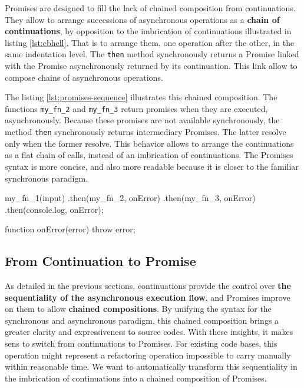 Promises are designed to fill the lack of chained composition from continuations.
They allow to arrange successions of asynchronous operations as a \textbf{chain of continuations}, by opposition to the imbrication of continuations illustrated in listing \ref{lst:cbhell}.
That is to arrange them, one operation after the other, in the same indentation level.
The \texttt{then} method synchronously returns a Promise linked with the Promise asynchronously returned by its continuation.
This link allow to compose chains of asynchronous operations.

The listing \ref{lst:promises-sequence} illustrates this chained composition.
The functions \texttt{my_fn_2} and \texttt{my_fn_3} return promises when they are executed, asynchronously.
Because these promises are not available synchronously, the method \texttt{then} synchronously returns intermediary Promises.
The latter resolve only when the former resolve.
This behavior allows to arrange the continuations as a flat chain of calls, instead of an imbrication of continuations.
The Promises syntax is more concise, and also more readable because it is closer to the familiar synchronous paradigm.

\begin{code}[js, %
             caption={The chain of Promises is more concise than an imbrication of continuations}, %
             label={lst:promises-sequence}] %
my_fn_1(input)
.then(my_fn_2, onError)
.then(my_fn_3, onError)
.then(console.log, onError);

function onError(error) {
  throw error;
}
\end{code}

\subsection{From Continuation to Promise} \label{seciton:definitions:analysis}

As detailed in the previous sections, continuations provide the control over \textbf{the sequentiality of the asynchronous execution flow}, and Promises improve on them to allow \textbf{chained compositions}.
By unifying the syntax for the synchronous and asynchronous paradigm, this chained composition brings a greater clarity and expressiveness to source codes.
With these insights, it makes sens to switch from continuations to Promises.
For existing code bases, this operation might represent a refactoring operation impossible to carry manually within reasonable time.
We want to automatically transform this sequentiality in the imbrication of continuations into a chained composition of Promises.

